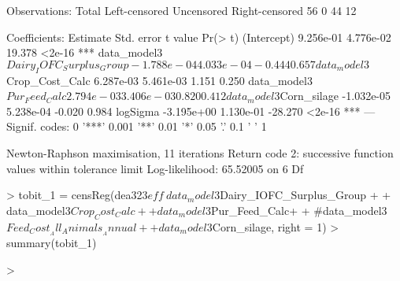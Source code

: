 \documentclass[12pt,]{article}
\begin{document}
\begin{Schunk}
\begin{Soutput}
Observations:
         Total  Left-censored     Uncensored Right-censored 
            56              0             44             12 

Coefficients:
                                       Estimate Std. error t value Pr(> t)    
(Intercept)                           9.256e-01  4.776e-02  19.378  <2e-16 ***
data_model3$Dairy_IOFC_Surplus_Group -1.788e-04  4.033e-04  -0.444   0.657    
data_model3$Crop_Cost_Calc            6.287e-03  5.461e-03   1.151   0.250    
data_model3$Pur_Feed_Calc             2.794e-03  3.406e-03   0.820   0.412    
data_model3$Corn_silage              -1.032e-05  5.238e-04  -0.020   0.984    
logSigma                             -3.195e+00  1.130e-01 -28.270  <2e-16 ***
---
Signif. codes:  0 '***' 0.001 '**' 0.01 '*' 0.05 '.' 0.1 ' ' 1

Newton-Raphson maximisation, 11 iterations
Return code 2: successive function values within tolerance limit
Log-likelihood: 65.52005 on 6 Df
\end{Soutput}
\begin{Sinput}
> tobit_1 = censReg(dea323$eff~data_model3$Dairy_IOFC_Surplus_Group +
+                   data_model3$Crop_Cost_Calc+
+                   data_model3$Pur_Feed_Calc+
+                   #data_model3$Feed_Cost__All_Animals__Annual+
+                   data_model3$Corn_silage, right = 1)
> summary(tobit_1)
\end{Sinput}
\begin{Sinput}
> 
\end{Sinput}
\end{Schunk}
\end{document}
